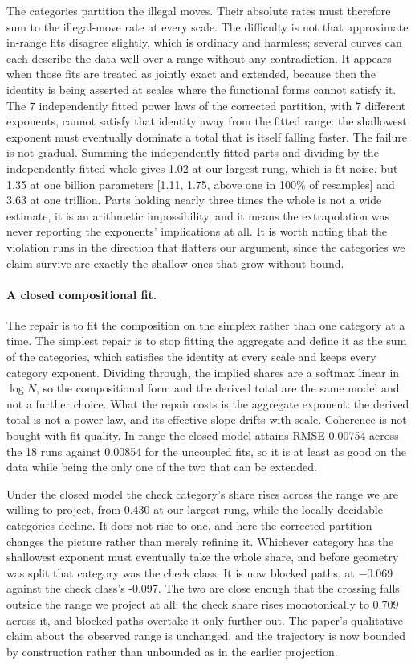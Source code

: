 \documentclass[11pt]{article}
\begin{document}
The categories partition the illegal moves. Their absolute rates must therefore sum
to the illegal-move rate at every scale. The difficulty is not that approximate
in-range fits disagree slightly, which is ordinary and harmless; several curves can
each describe the data well over a range without any contradiction. It appears when
those fits are treated as jointly exact and extended, because then the identity is
being asserted at scales where the functional forms cannot satisfy it. The 7 independently fitted
power laws of the corrected partition, with 7 different exponents, cannot
satisfy that identity away from the fitted
range: the shallowest exponent must eventually dominate a total that is itself
falling faster. The failure is not gradual. Summing the independently fitted parts
and dividing by the independently fitted whole gives 1.02 at our
largest rung, which is fit noise, but 1.35 at one billion parameters
[1.11, 1.75, above one in
100\% of resamples] and 3.63 at one trillion.
Parts holding nearly three times the whole is not a wide estimate, it is an
arithmetic impossibility, and it means the extrapolation was never reporting the
exponents' implications at all. It is worth noting that the violation runs in the
direction that flatters our argument, since the categories we claim survive are
exactly the shallow ones that grow without bound.

\paragraph{A closed compositional fit.}
The repair is to fit the composition on the simplex rather than one category at a
time. The simplest repair is to stop fitting the aggregate and define it as the sum
of the categories, which satisfies the identity at every scale and keeps every
category exponent. Dividing through, the implied shares are a softmax linear in
$\log N$, so the compositional form and the derived total are the same model and
not a further choice. What the repair costs is the aggregate exponent: the derived
total is not a power law, and its effective slope drifts with scale. Coherence is not bought with fit quality. In range the closed model
attains RMSE 0.00754 across the 18 runs against
0.00854 for the uncoupled fits, so it is at least as good on the
data while being the only one of the two that can be extended.

Under the closed model the check category's share rises across the range we are
willing to project, from 0.430 at our largest rung, while the locally
decidable categories decline. It does not rise to one, and here the corrected
partition changes the picture rather than merely refining it. Whichever category has
the shallowest exponent must eventually take the whole share, and before geometry was
split that category was the check class. It is now blocked paths, at $-$0.069
against the check class's -0.097. The two are close enough that the crossing
falls outside the range we project at all: the check share rises monotonically to
0.709 across it, and blocked paths overtake it only further out. The paper's
qualitative claim about the observed range is unchanged, and the trajectory is now
bounded by construction rather than unbounded as in the earlier projection.
\end{document}
